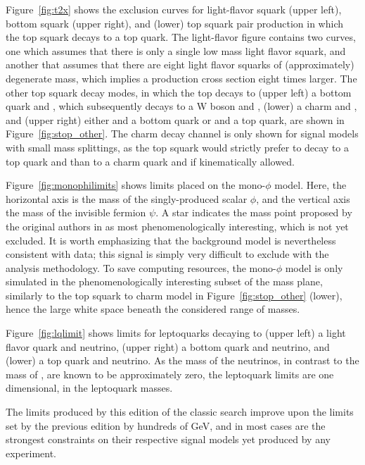   Figure~\ref{fig:t2x} shows the exclusion curves for light-flavor squark (upper left), bottom squark (upper right), and (lower) top squark pair production in which the top squark decays to a top quark. 
  The light-flavor figure contains two curves, one which assumes that there is only a single low mass light flavor squark, and another that assumes that there are eight light flavor squarks of (approximately) degenerate mass, which implies a production cross section eight times larger.
  The other top squark decay modes, in which the top decays to (upper left) a bottom quark and \chargino, which subsequently decays to a W boson and \lsp, (lower) a charm and \lsp, and (upper right) either \chargino and a bottom quark or \lsp and a top quark, are shown in Figure~\ref{fig:stop_other}.
  The charm decay channel is only shown for signal models with small mass splittings, as the top squark would strictly prefer to decay to a top quark and \lsp than to a charm quark and \lsp if kinematically allowed.

  Figure~\ref{fig:monophilimits} shows limits placed on the mono-$\phi$ model.
  Here, the horizontal axis is the mass of the singly-produced scalar $\phi$, and the vertical axis the mass of the invisible fermion $\psi$.
  A star indicates the mass point proposed by the original authors in \cite{monophi} as most phenomenologically interesting, which is not yet excluded.
  It is worth emphasizing that the background model is nevertheless consistent with data; this signal is simply very difficult to exclude with the \mttwo analysis methodology.
  To save computing resources, the mono-$\phi$ model is only simulated in the phenomenologically interesting subset of the mass plane, similarly to the top squark to charm model in Figure~\ref{fig:stop_other} (lower), hence the large white space beneath the considered range of masses.

  Figure~\ref{fig:lqlimit} shows limits for leptoquarks decaying to (upper left) a light flavor quark and neutrino, (upper right) a bottom quark and neutrino, and (lower) a top quark and neutrino.
  As the mass of the neutrinos, in contrast to the mass of \lsp, are known to be approximately zero, the leptoquark limits are one dimensional, in the leptoquark masses.

  The limits produced by this edition of the classic search improve upon the limits set by the previous edition \cite{MT2_2016} by hundreds of GeV, and in most cases are the strongest constraints on their respective signal models yet produced by any experiment.

